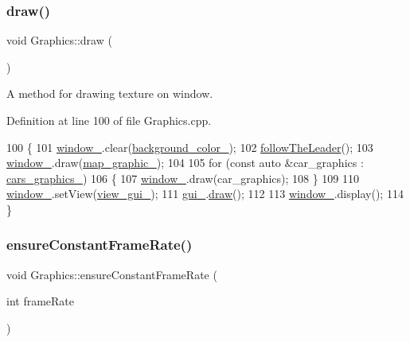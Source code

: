 \subsubsection{\texorpdfstring{draw()}{draw()}}
{\footnotesize\ttfamily void Graphics\+::draw (\begin{DoxyParamCaption}{ }\end{DoxyParamCaption})}



A method for drawing texture on window. 



Definition at line 100 of file Graphics.\+cpp.


\begin{DoxyCode}
100                     \{
101     \hyperlink{classGraphics_ac760fe1abb0b648844c9f15afa087ef6}{window\_}.clear(\hyperlink{classGraphics_a44d7a76a58e03b8ad3f025123894c526}{background\_color\_});
102     \hyperlink{classGraphics_ad3718f2541f28115865058823113f5cd}{followTheLeader}();
103     \hyperlink{classGraphics_ac760fe1abb0b648844c9f15afa087ef6}{window\_}.draw(\hyperlink{classGraphics_a7b3e98774ea965783584d5351c730276}{map\_graphic\_});
104 
105     \textcolor{keywordflow}{for} (\textcolor{keyword}{const} \textcolor{keyword}{auto} &car\_graphics : \hyperlink{classGraphics_a8be356ffe3ee47f915027361b6ae34ab}{cars\_graphics\_})
106     \{
107         \hyperlink{classGraphics_ac760fe1abb0b648844c9f15afa087ef6}{window\_}.draw(car\_graphics);
108     \}
109 
110     \hyperlink{classGraphics_ac760fe1abb0b648844c9f15afa087ef6}{window\_}.setView(\hyperlink{classGraphics_aaca5b237fae17f3166f8f28e4c363e06}{view\_gui\_});
111     \hyperlink{classGraphics_ac582857f6b0de010eabd0146c4a5f4d2}{gui\_}.\hyperlink{classGraphicalUserInterface_a268c54faf6a8ac32628c60495900ea1c}{draw}();
112 
113     \hyperlink{classGraphics_ac760fe1abb0b648844c9f15afa087ef6}{window\_}.display();
114 \}
\end{DoxyCode}
\mbox{\label{classGraphics_a283310b7fe274dab0544d307525198dc}} 
\subsubsection{\texorpdfstring{ensure\+Constant\+Frame\+Rate()}{ensureConstantFrameRate()}}
{\footnotesize\ttfamily void Graphics\+::ensure\+Constant\+Frame\+Rate (\begin{DoxyParamCaption}\item[{int}]{frame\+Rate }\end{DoxyParamCaption})}



